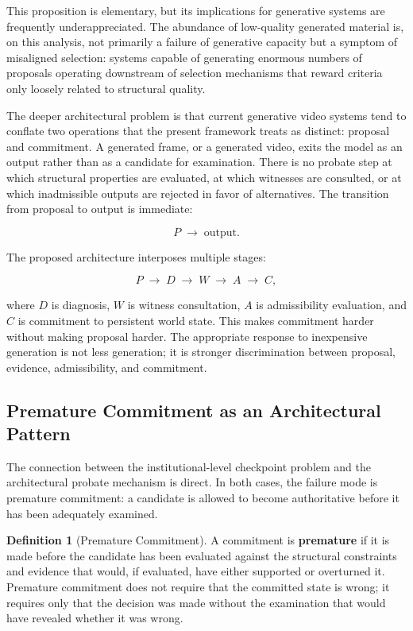 \documentclass[12pt,a4paper]{article}
\theoremstyle{plain}
\theoremstyle{definition}
\newtheorem{definition}[theorem]{Definition}
\theoremstyle{remark}
\begin{document}
This proposition is elementary, but its implications for generative systems are frequently underappreciated. The abundance of low-quality generated material is, on this analysis, not primarily a failure of generative capacity but a symptom of misaligned selection: systems capable of generating enormous numbers of proposals operating downstream of selection mechanisms that reward criteria only loosely related to structural quality.

The deeper architectural problem is that current generative video systems tend to conflate two operations that the present framework treats as distinct: proposal and commitment. A generated frame, or a generated video, exits the model as an output rather than as a candidate for examination. There is no probate step at which structural properties are evaluated, at which witnesses are consulted, or at which inadmissible outputs are rejected in favor of alternatives. The transition from proposal to output is immediate:

\[
P \;\longrightarrow\; \text{output}.
\]

The proposed architecture interposes multiple stages:

\[
P \;\longrightarrow\; D \;\longrightarrow\; W \;\longrightarrow\; A \;\longrightarrow\; C,
\]

where $D$ is diagnosis, $W$ is witness consultation, $A$ is admissibility evaluation, and $C$ is commitment to persistent world state. This makes commitment harder without making proposal harder. The appropriate response to inexpensive generation is not less generation; it is stronger discrimination between proposal, evidence, admissibility, and commitment.

\subsection{Premature Commitment as an Architectural Pattern}

The connection between the institutional-level checkpoint problem and the architectural probate mechanism is direct. In both cases, the failure mode is premature commitment: a candidate is allowed to become authoritative before it has been adequately examined.

\begin{definition}[Premature Commitment]
A commitment is \textbf{premature} if it is made before the candidate has been evaluated against the structural constraints and evidence that would, if evaluated, have either supported or overturned it. Premature commitment does not require that the committed state is wrong; it requires only that the decision was made without the examination that would have revealed whether it was wrong.
\end{definition}
\end{document}
